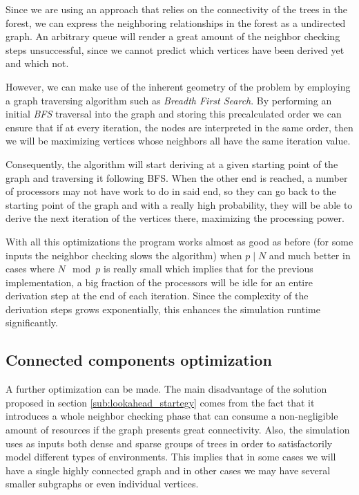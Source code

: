 \documentclass[letterpaper,twoside,11pt]{article}
\begin{document}
\begin{multicols}{2}
\begin{compactenum}[a)]
Since we are using an approach that relies on the connectivity of the trees in the forest, we can express the neighboring relationships in the forest as a undirected graph. An arbitrary queue will render a great amount of the neighbor checking steps unsuccessful, since we cannot predict which vertices have been derived yet and which not.

However, we can make use of the inherent geometry of the problem by employing a graph traversing algorithm such as \emph{Breadth First Search}. By performing an initial \emph{BFS} traversal into the graph and storing this precalculated order we can ensure that if at every iteration, the nodes are interpreted in the same order, then we will be maximizing vertices whose neighbors all have the same iteration value.

Consequently, the algorithm will start deriving at a given starting point of the graph and traversing it following BFS. When the other end is reached, a number of processors may not have work to do in said end, so they can go back to the starting point of the graph and  with a really high probability, they will be able to derive the next iteration of the vertices there, maximizing the processing power.

\end{compactenum}

With all this optimizations the program works almost as good as before (for some inputs the neighbor checking slows the algorithm) when $p \mid N$ and much better in cases where $N \mod p$ is really small which implies that for the previous implementation, a big fraction of the processors will be idle for an entire derivation step at the end of each iteration. Since the complexity of the derivation steps grows exponentially, this enhances the simulation runtime significantly.



\subsection{Connected components optimization} %
\label{sub:connected_components}

A further optimization can be made. The main disadvantage of the solution proposed in section \ref{sub:lookahead_startegy} comes from the fact that it introduces a whole neighbor checking phase that can consume a non-negligible amount of resources if the graph presents great connectivity. Also, the simulation uses as inputs both dense and sparse groups of trees in order to satisfactorily model different types of environments. This implies that in some cases we will have a single highly connected graph and in other cases we may have several smaller subgraphs or even individual vertices.


\end{multicols}
\end{document}
